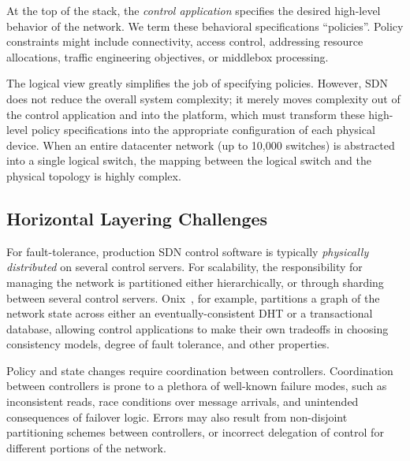 At the top of the stack, the \emph{control application} specifies the desired
high-level behavior of the network. We term these behavioral specifications
``policies''. Policy constraints might include connectivity, access control,
addressing resource allocations, traffic engineering objectives, or middlebox
processing.

The logical view greatly simplifies the job of specifying policies. However, SDN
does not reduce the overall system complexity; it merely moves complexity out of
the control application and into the platform, which must transform these
high-level policy specifications into the appropriate configuration of each
physical device. When an entire datacenter network (up to 10,000 switches) is
abstracted into a single logical switch, the mapping between the logical switch
and the physical topology is highly complex.


\subsection{Horizontal Layering Challenges}

For fault-tolerance, production SDN control software is typically \emph{physically
distributed} on several control servers. For scalability, the responsibility for
managing the network is partitioned either hierarchically, or through sharding between
several control servers. Onix~\cite{onix}, for example, partitions a
graph of the network state across either an eventually-consistent DHT or a
transactional database, allowing control applications to make their own
tradeoffs in choosing consistency models, degree of fault tolerance, and other
properties.

Policy and state changes require coordination between controllers.
Coordination between controllers is prone to a plethora of well-known failure
modes, such as inconsistent reads, race conditions over message arrivals, and
unintended consequences of failover logic. Errors may also result from
non-disjoint partitioning schemes between controllers, or incorrect delegation
of control for different portions of the network.

